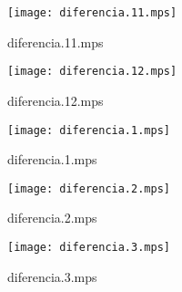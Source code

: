 \documentclass[letterpaper,10pt]{article}
\begin{document}
\begin{figure}
    \centering
    \texttt{[image: diferencia.11.mps]}
    \caption{diferencia.11.mps}
\end{figure}

\begin{figure}
    \centering
    \texttt{[image: diferencia.12.mps]}
    \caption{diferencia.12.mps}
\end{figure}

\begin{figure}
    \centering
    \texttt{[image: diferencia.1.mps]}
    \caption{diferencia.1.mps}
\end{figure}

\begin{figure}
    \centering
    \texttt{[image: diferencia.2.mps]}
    \caption{diferencia.2.mps}
\end{figure}

\begin{figure}
    \centering
    \texttt{[image: diferencia.3.mps]}
    \caption{diferencia.3.mps}
\end{figure}
\end{document}
